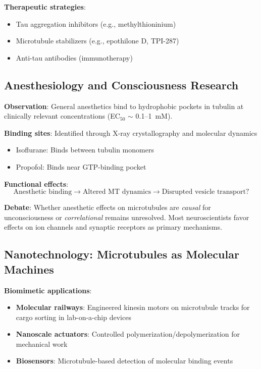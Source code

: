 \textbf{Therapeutic strategies}:
\begin{itemize}
\item Tau aggregation inhibitors (e.g., methylthioninium)
\item Microtubule stabilizers (e.g., epothilone D, TPI-287)
\item Anti-tau antibodies (immunotherapy)
\end{itemize}

\subsection{Anesthesiology and Consciousness Research}
\label{subsec:anesthesia}

\textbf{Observation}: General anesthetics bind to hydrophobic pockets in tubulin at clinically relevant concentrations (EC$_{50}$ $\sim$ 0.1--1~mM).

\textbf{Binding sites}: Identified through X-ray crystallography and molecular dynamics
\begin{itemize}
\item Isoflurane: Binds between tubulin monomers
\item Propofol: Binds near GTP-binding pocket
\end{itemize}

\textbf{Functional effects}:
\begin{equation}
\text{Anesthetic binding} \rightarrow \text{Altered MT dynamics} \rightarrow \text{Disrupted vesicle transport?}
\label{eq:anesthetic-cascade}
\end{equation}

\begin{warningbox}
\textbf{Debate}: Whether anesthetic effects on microtubules are \textit{causal} for unconsciousness or \textit{correlational} remains unresolved. Most neuroscientists favor effects on ion channels and synaptic receptors as primary mechanisms.
\end{warningbox}

\subsection{Nanotechnology: Microtubules as Molecular Machines}
\label{subsec:nanotech}

\textbf{Biomimetic applications}:
\begin{itemize}
\item \textbf{Molecular railways}: Engineered kinesin motors on microtubule tracks for cargo sorting in lab-on-a-chip devices
\item \textbf{Nanoscale actuators}: Controlled polymerization/depolymerization for mechanical work
\item \textbf{Biosensors}: Microtubule-based detection of molecular binding events
\end{itemize}

